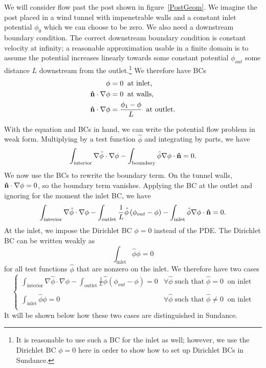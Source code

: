 We will consider flow past the post shown in figure~\ref{PostGeom}. We imagine
the post placed in a wind tunnel with impenetrable walls and a constant
inlet potential $\phi_0$ which we can choose to be zero. 
We also need a downstream boundary condition. The
correct downstream boundary condition is constant velocity at infinity;
a reasonable approximation usable in a finite domain
is to assume the potential increases
linearly towards some constant potential $\phi_{out}$ some distance $L$
downstream from the outlet.\footnote{It is reasonable to use such a BC for
the inlet as well; however, we use the Dirichlet BC $\phi=0$ here in order
to show how to set up Dirichlet BCs in Sundance.} 
We therefore have BCs
\begin{eqnarray}
\phi&=0 \;\; \text{at inlet,}\\
{\bf\hat n}\cdot\nabla\phi&=0 \;\; \text{at walls,}\\
{\bf\hat n}\cdot\nabla\phi&=\frac{\phi_1-\phi}{L} \;\; \text{at outlet.}\\
\end{eqnarray}

With the equation and BCs in hand, we can write the potential flow problem
in weak form. Multiplying by a test function ${\hat\phi}$ and integrating
by parts, we have
\begin{equation}
\int_\text{interior} \nabla{\hat\phi}\cdot\nabla\phi 
-\int_\text{boundary} {\hat\phi} \nabla\phi \cdot {\bf\hat n} = 0. 
\end{equation}
We now use the BCs to rewrite the boundary term. On the tunnel walls, 
${\bf\hat n}\cdot\nabla\phi=0$, so the boundary term vanishes. Applying the
BC at the outlet and ignoring for the moment the inlet BC, we have
\begin{equation}
\int_\text{interior} \nabla{\hat\phi}\cdot\nabla\phi 
-\int_\text{outlet} \frac{1}{L}{\hat\phi}\left(\phi_{out} - \phi\right) 
-\int_\text{inlet} {\hat\phi} \nabla\phi \cdot {\bf\hat n} = 0. 
\end{equation}
At the inlet, we impose the Dirichlet BC $\phi=0$ instead of the PDE.
The Dirichlet BC can be written weakly as
\begin{equation}
\int_\text{inlet} {\hat\phi} \phi = 0
\end{equation}
for all test functions ${\hat\phi}$ that are nonzero on the inlet.
We therefore have two cases
\begin{equation}
\begin{cases}
\int_\text{interior} \nabla{\hat\phi}\cdot\nabla\phi 
-\int_\text{outlet} \frac{1}{L}{\hat\phi}\left(\phi_{out} - \phi\right) = 0
& \forall {\hat \phi}\;\text{such that}\;
 {\hat \phi} = 0 \;\; \text{on inlet}\\
\\
\int_\text{inlet} {\hat\phi} \phi = 0
& \forall {\hat \phi}\; \text{such that}\;
{\hat \phi} \ne 0 \;\; \text{on inlet}\\
\end{cases}
\end{equation}
It will be shown below how these two cases are distinguished in Sundance.